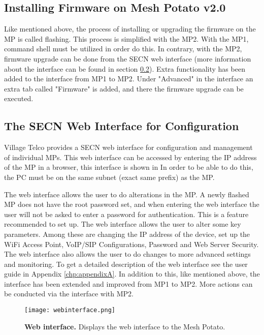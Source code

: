 \subsection{Installing Firmware on Mesh Potato v2.0}
Like mentioned above, the process of installing or upgrading the firmware on the MP is called flashing. This process is simplified with the MP2. With the MP1, command shell must be utilized in order do this. In contrary, with the MP2, firmware upgrade can be done from the SECN web interface (more information about the interface can be found in section \ref{subsec:interface}). Extra functionality has been added to the interface from MP1 to MP2. Under "Advanced" in the interface an extra tab called "Firmware" is added, and there the firmware upgrade can be executed. 

\subsection{The SECN Web Interface for Configuration}
\label{subsec:interface}
Village Telco provides a SECN web interface for configuration and management of individual MPs. This web interface can be accessed by entering the IP address of the MP in a browser, this interface is shown in  In order to be able to do this, the PC must be on the same subnet (exact same prefix) as the MP.  

The web interface allows the user to do alterations in the MP. A newly flashed MP does not have the root password set, and when entering the web interface the user will not be asked to enter a password for authentication. This is a feature recommended to set up.  The web interface allows the user to alter some key parameters. Among these are changing the IP address of the device, set up the WiFi Access Point, VoIP/SIP Configurations, Password and Web Server Security. The web interface also allows the user to do changes to more advanced settings and monitoring. To get a detailed description of the web interface see the user guide in Appendix \ref{chp:appendixA}. In addition to this, like mentioned above, the interface has been extended and improved from MP1 to MP2. More actions can be conducted via the interface with MP2. 

\begin{figure}[t]
  \centering
      \texttt{[image: webinterface.png]}
  \caption [Web interface]{\textbf{Web interface.} Displays the web interface to the Mesh Potato.}
  \label{fig:webinterface}
\end{figure}


